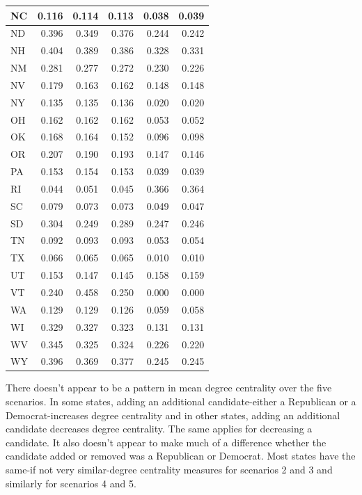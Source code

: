 \documentclass[]{article}
\begin{document}
\begin{table}[!h]
\begin{tabular}{l|r|r|r|r|r}
\hline
\rowcolor{gray!6}  NC & 0.116 & 0.114 & 0.113 & 0.038 & 0.039\\
\hline
ND & 0.396 & 0.349 & 0.376 & 0.244 & 0.242\\
\hline
\rowcolor{gray!6}  NH & 0.404 & 0.389 & 0.386 & 0.328 & 0.331\\
\hline
NM & 0.281 & 0.277 & 0.272 & 0.230 & 0.226\\
\hline
\rowcolor{gray!6}  NV & 0.179 & 0.163 & 0.162 & 0.148 & 0.148\\
\hline
NY & 0.135 & 0.135 & 0.136 & 0.020 & 0.020\\
\hline
\rowcolor{gray!6}  OH & 0.162 & 0.162 & 0.162 & 0.053 & 0.052\\
\hline
OK & 0.168 & 0.164 & 0.152 & 0.096 & 0.098\\
\hline
\rowcolor{gray!6}  OR & 0.207 & 0.190 & 0.193 & 0.147 & 0.146\\
\hline
PA & 0.153 & 0.154 & 0.153 & 0.039 & 0.039\\
\hline
\rowcolor{gray!6}  RI & 0.044 & 0.051 & 0.045 & 0.366 & 0.364\\
\hline
SC & 0.079 & 0.073 & 0.073 & 0.049 & 0.047\\
\hline
\rowcolor{gray!6}  SD & 0.304 & 0.249 & 0.289 & 0.247 & 0.246\\
\hline
TN & 0.092 & 0.093 & 0.093 & 0.053 & 0.054\\
\hline
\rowcolor{gray!6}  TX & 0.066 & 0.065 & 0.065 & 0.010 & 0.010\\
\hline
UT & 0.153 & 0.147 & 0.145 & 0.158 & 0.159\\
\hline
\rowcolor{gray!6}  VT & 0.240 & 0.458 & 0.250 & 0.000 & 0.000\\
\hline
WA & 0.129 & 0.129 & 0.126 & 0.059 & 0.058\\
\hline
\rowcolor{gray!6}  WI & 0.329 & 0.327 & 0.323 & 0.131 & 0.131\\
\hline
WV & 0.345 & 0.325 & 0.324 & 0.226 & 0.220\\
\hline
\rowcolor{gray!6}  WY & 0.396 & 0.369 & 0.377 & 0.245 & 0.245\\
\hline
\end{tabular}
\end{table}

There doesn't appear to be a pattern in mean degree centrality over the
five scenarios. In some states, adding an additional candidate-either a
Republican or a Democrat-increases degree centrality and in other
states, adding an additional candidate decreases degree centrality. The
same applies for decreasing a candidate. It also doesn't appear to make
much of a difference whether the candidate added or removed was a
Republican or Democrat. Most states have the same-if not very
similar-degree centrality measures for scenarios 2 and 3 and similarly
for scenarios 4 and 5.
\end{document}
